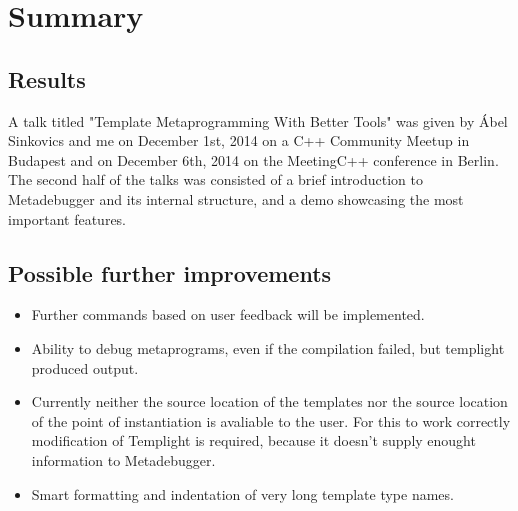 
\chapter{Summary}

\section{Results}

A talk titled "Template Metaprogramming With Better Tools" was given by Ábel
Sinkovics and me on December 1st, 2014 on a C++ Community
Meetup\cite{cpp-meetup} in Budapest and on December 6th, 2014 on the
MeetingC++ conference\cite{meeting-cpp} in Berlin. The second half of the talks
was consisted of a brief introduction to Metadebugger and its internal
structure, and a demo showcasing the most important features.

\section{Possible further improvements}

\begin{itemize}
    \item
        Further commands based on user feedback will be implemented.
    \item
        Ability to debug metaprograms, even if the compilation failed, but
        templight produced output.
    \item
        Currently neither the source location of the templates nor the source
        location of the point of instantiation is avaliable to the user. For
        this to work correctly modification of Templight is required, because
        it doesn't supply enought information to Metadebugger.
    \item
        Smart formatting and indentation of very long template type names.
\end{itemize}
